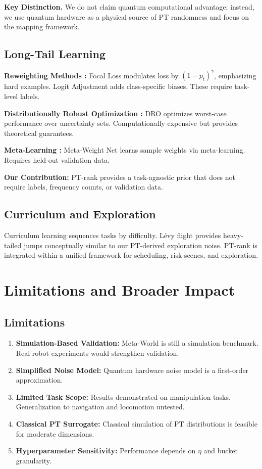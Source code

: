 \documentclass[11pt, a4paper, oneside]{article}
\theoremstyle{plain}
\theoremstyle{break}
\theoremstyle{plain}
\theoremstyle{breakdef}
\theoremstyle{plain}
\theoremstyle{breakrem}
\theoremstyle{plain}
\theoremstyle{breakrem}
\begin{document}
\textbf{Key Distinction.} We do not claim quantum computational advantage; instead, we use quantum hardware as a physical source of PT randomness and focus on the mapping framework.

\subsection{Long-Tail Learning}
\textbf{Reweighting Methods \cite{lin2017focal,menon2021longtail}:} Focal Loss modulates loss by $(1-p_t)^\gamma$, emphasizing hard examples. Logit Adjustment adds class-specific biases. These require task-level labels.

\textbf{Distributionally Robust Optimization \cite{sinha2018certifiable}:} DRO optimizes worst-case performance over uncertainty sets. Computationally expensive but provides theoretical guarantees.

\textbf{Meta-Learning \cite{shu2019metaweight}:} Meta-Weight Net learns sample weights via meta-learning. Requires held-out validation data.

\textbf{Our Contribution:} PT-rank provides a task-agnostic prior that does not require labels, frequency counts, or validation data.

\subsection{Curriculum and Exploration}
Curriculum learning \cite{bengio2009curriculum} sequences tasks by difficulty. L\'evy flight \cite{pavlyukevich2007levy} provides heavy-tailed jumps conceptually similar to our PT-derived exploration noise. PT-rank is integrated within a unified framework for scheduling, risk-scenes, and exploration.

\section{Limitations and Broader Impact}
\label{sec:limit}

\subsection{Limitations}
\begin{enumerate}
    \item \textbf{Simulation-Based Validation:} Meta-World is still a simulation benchmark. Real robot experiments would strengthen validation.
    \item \textbf{Simplified Noise Model:} Quantum hardware noise model is a first-order approximation.
    \item \textbf{Limited Task Scope:} Results demonstrated on manipulation tasks. Generalization to navigation and locomotion untested.
    \item \textbf{Classical PT Surrogate:} Classical simulation of PT distributions is feasible for moderate dimensions.
    \item \textbf{Hyperparameter Sensitivity:} Performance depends on $\eta$ and bucket granularity.
\end{enumerate}
\end{document}
